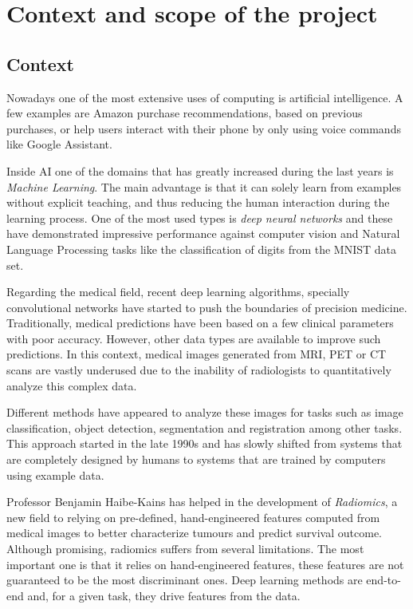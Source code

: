 
\section{Context and scope of the project}
\subsection{Context}

Nowadays one of the most extensive uses of computing is artificial intelligence. A few 
examples are Amazon purchase recommendations, based on previous purchases, or help users
interact with their phone by only using voice commands like Google Assistant. 
~\cites{neural:amazon}{neural:google-assistant}

Inside AI one of the domains that has greatly increased during the last years is 
\emph{Machine Learning}. The main advantage is that it can solely learn from examples without 
explicit teaching, and thus reducing the human interaction during the learning process. One of the 
most used types is \emph{deep neural networks} and these have demonstrated impressive performance 
against computer vision and Natural Language Processing tasks like the classification of 
digits from the MNIST data set.
~\cites{neural:mnist}{neural:empirical-evaluation-deep-architectures}

Regarding the medical field, recent deep learning algorithms, specially convolutional networks 
have started to push the boundaries of precision medicine. 
Traditionally, medical predictions have been based on a few clinical parameters with poor accuracy.
However, other data types are available to improve such predictions. In this context, medical
images generated from MRI, PET or CT scans are vastly underused due to the inability of radiologists
to quantitatively analyze this complex data.

Different methods have appeared to analyze these images for tasks such as
image classification, object detection, segmentation and registration among other tasks. This
approach started in the late 1990s and has slowly shifted from systems that are completely designed
by humans to systems that are trained by computers using example data. 
~\cite{medical:survey-deep-learning}

Professor Benjamin Haibe-Kains has helped in the development of \emph{Radiomics}, a new field to
relying on pre-defined, hand-engineered features computed from medical images to better 
characterize tumours and predict survival outcome. Although promising, radiomics suffers from 
several limitations. The most important one is that it relies on hand-engineered features,
these features are not guaranteed to be the most discriminant ones. Deep learning methods
are end-to-end and, for a given task, they drive features from the data.
~\cite{medical:radiomics-ml-classifiers}

